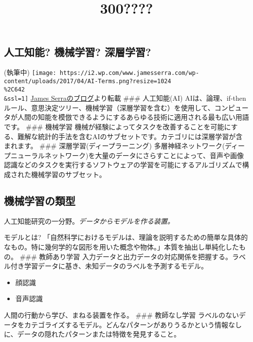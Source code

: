 \documentclass[11pt]{article}
\title{300????}
\makeatletter
\def\maxwidth{\ifdim\Gin@nat@width>\linewidth\linewidth
    \else\Gin@nat@width\fi}
\let\Oldincludegraphics\includegraphics
\renewcommand{\includegraphics}[1]{\Oldincludegraphics[width=.8\maxwidth]{#1}}
\providecommand{\tightlist}{%
      \setlength{\itemsep}{0pt}\setlength{\parskip}{0pt}}
\makeatother
\begin{document}
    
    
    \maketitle
    
    

    
    \subsection{人工知能? 機械学習?
深層学習?}\label{ux4ebaux5de5ux77e5ux80fd-ux6a5fux68b0ux5b66ux7fd2-ux6df1ux5c64ux5b66ux7fd2}

(執筆中)
\texttt{[image: https://i2.wp.com/www.jamesserra.com/wp-content/uploads/2017/04/AI-Terms.png?resize=1024\\\%2C642\\\&ssl=1]}
\href{http://www.jamesserra.com/archive/2017/04/artificial-intelligence-defined/}{James
Serraのブログ}より転載 \#\#\# 人工知能(AI)
AIは、論理、if-thenルール、意思決定ツリー、機械学習（深層学習を含む）を使用して、コンピュータが人間の知能を模倣できるようにするあらゆる技術に適用される最も広い用語です。
\#\#\# 機械学習
機械が経験によってタスクを改善することを可能にする、難解な統計的手法を含むAIのサブセットです。カテゴリには深層学習が含まれます。
\#\#\# 深層学習(ディープラーニング)
多層神経ネットワーク(ディープニューラルネットワーク)を大量のデータにさらすことによって、音声や画像認識などのタスクを実行するソフトウェアの学習を可能にするアルゴリズムで構成された機械学習のサブセット。

    \subsection{機械学習の類型}\label{ux6a5fux68b0ux5b66ux7fd2ux306eux985eux578b}

人工知能研究の一分野。\emph{データからモデルを作る装置。}

モデルとは?
「自然科学におけるモデルは、理論を説明するための簡単な具体的なもの。特に幾何学的な図形を用いた概念や物体。」本質を抽出し単純化したもの。
\#\#\# 教師あり学習
入力データと出力データの対応関係を把握する。ラベル付き学習データに基き、未知データのラベルを予測するモデル。

\begin{itemize}
\tightlist
\item
  顔認識
\item
  音声認識
\end{itemize}

人間の行動から学び、まねる装置を作る。 \#\#\# 教師なし学習
ラベルのないデータをカテゴライズするモデル。どんなパターンがありうるかという情報なしに、データの隠れたパターンまたは特徴を発見すること。
\end{document}
